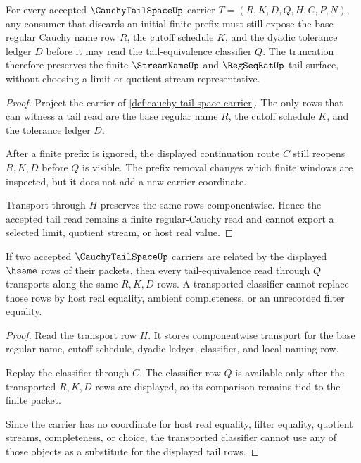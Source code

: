 \begin{theorem}
\label{thm:cauchy-tail-space-tail-truncation-stability}
For every accepted $\CauchyTailSpaceUp$ carrier $T=(R,K,D,Q,H,C,P,N)$, any consumer that discards an initial finite prefix must still expose the base regular Cauchy name row $R$, the cutoff schedule $K$, and the dyadic tolerance ledger $D$ before it may read the tail-equivalence classifier $Q$. The truncation therefore preserves the finite $\StreamNameUp$ and $\RegSeqRatUp$ tail surface, without choosing a limit or quotient-stream representative.
\end{theorem}
\begin{proof}
Project the carrier of \autoref{def:cauchy-tail-space-carrier}. The only rows that can witness a tail read are the base regular name $R$, the cutoff schedule $K$, and the tolerance ledger $D$.

After a finite prefix is ignored, the displayed continuation route $C$ still reopens $R,K,D$ before $Q$ is visible. The prefix removal changes which finite windows are inspected, but it does not add a new carrier coordinate.

Transport through $H$ preserves the same rows componentwise. Hence the accepted tail read remains a finite regular-Cauchy read and cannot export a selected limit, quotient stream, or host real value.
\end{proof}

\begin{theorem}
\label{thm:cauchy-tail-space-tail-classifier-transport}
If two accepted $\CauchyTailSpaceUp$ carriers are related by the displayed $\hsame$ rows of their packets, then every tail-equivalence read through $Q$ transports along the same $R,K,D$ rows. A transported classifier cannot replace those rows by host real equality, ambient completeness, or an unrecorded filter equality.
\end{theorem}
\begin{proof}
Read the transport row $H$. It stores componentwise transport for the base regular name, cutoff schedule, dyadic ledger, classifier, and local naming row.

Replay the classifier through $C$. The classifier row $Q$ is available only after the transported $R,K,D$ rows are displayed, so its comparison remains tied to the finite packet.

Since the carrier has no coordinate for host real equality, filter equality, quotient streams, completeness, or choice, the transported classifier cannot use any of those objects as a substitute for the displayed tail rows.
\end{proof}

